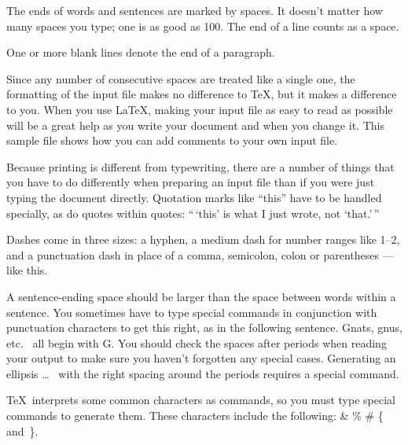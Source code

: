 \documentclass[aoas,preprint]{imsart}
\numberwithin{equation}{section}
\theoremstyle{plain}
\begin{document}
{The ends  of words and sentences are marked
  by   spaces. It  doesn't matter how many
spaces    you type; one is as good as 100.  The
end of   a line counts as a space.

One   or more   blank lines denote the  end
of  a paragraph.

Since any number of consecutive spaces are treated like a single
one, the formatting of the input file makes no difference to
      \TeX,         %
but it makes a difference to you.
When you use
      \LaTeX,       %
making your input file as easy to read as possible
will be a great help as you write your document and when you
change it.  This sample file shows how you can add comments to
your own input file.

Because printing is different from typewriting, there are a
number of things that you have to do differently when preparing
an input file than if you were just typing the document directly.
Quotation marks like
       ``this''
have to be handled specially, as do quotes within quotes:
       ``\,`this'                  %
    is what I just
    wrote, not  `that.'\,''

Dashes come in three sizes: a hyphen, %
a medium dash for number ranges like
       1--2,
and a punctuation dash in place of a comma, semicolon, colon or parentheses
       ---like
this.

A sentence-ending space should be larger than the space between words
within a sentence.  You sometimes have to type special commands in
conjunction with punctuation characters to get this right, as in the
following sentence.
       Gnats, gnus, etc.\    %
       all begin with G\@.   %
You should check the spaces after periods when reading your output to
make sure you haven't forgotten any special cases.
Generating an ellipsis
       \ldots\    %
with the right spacing around the periods
requires a special  command.

\TeX\ interprets some common characters as commands, so you must type
special commands to generate them.  These characters include the
following:
        \& \% \# \{ and~\}.

}
\end{document}
